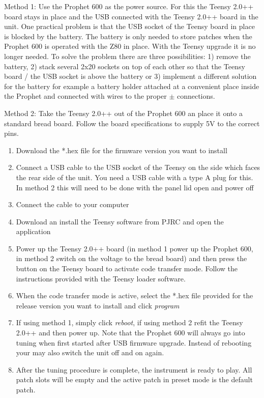 Method 1: Use the Prophet 600 as the power source. For this the Teensy 2.0++ board stays in place and the USB connected with the Teensy 2.0++ board in the unit. One practical problem is that the USB socket of the Teensy board in place is blocked by the battery. The battery is only needed to store patches when the Prophet 600 is operated with the Z80 in place. With the Teensy upgrade it is no longer needed. To solve the problem there are three possibilities: 1) remove the battery, 2) stack several 2x20 sockets on top of each other so that the Teensy board / the USB socket is above the battery or 3) implement a different solution for the battery for example a battery holder attached at a convenient place inside the Prophet and connected with wires to the proper $\pm$ connections. 

Method 2: Take the Teensy 2.0++ out of the Prophet 600 an place it onto a standard bread board. Follow the board specifications to supply 5V to the correct pins.

\begin{enumerate}
  \item Download the *.hex file for the firmware version you want to install 
  \item Connect a USB cable to the USB socket of the Teensy on the side which faces the rear side of the unit. You need a USB cable with a type A plug for this. In method 2 this will need to be done with the panel lid open and power off 
  \item Connect the cable to your computer 
  \item Download an install the Teensy software from PJRC \cite{teensyloader} and open the application 
  \item Power up the Teensy 2.0++ board (in method 1 power up the Prophet 600, in method 2 switch on the voltage to the bread board) and then press the button on the Teensy board to activate code transfer mode. Follow the instructions provided with the Teensy loader software. 
  \item When the code transfer mode is active, select the *.hex file provided for the release version you want to install and click \textit{program}
  \item If using method 1, simply click \textit{reboot}, if using method 2 refit the Teensy 2.0++ and then power up. Note that the Prophet 600 will always go into tuning when first started after USB firmware upgrade. Instead of rebooting your may also switch the unit off and on again.   
  \item After the tuning procedure is complete, the instrument is ready to play. All patch slots will be empty and the active patch in preset mode is the default patch. 
\end{enumerate}
